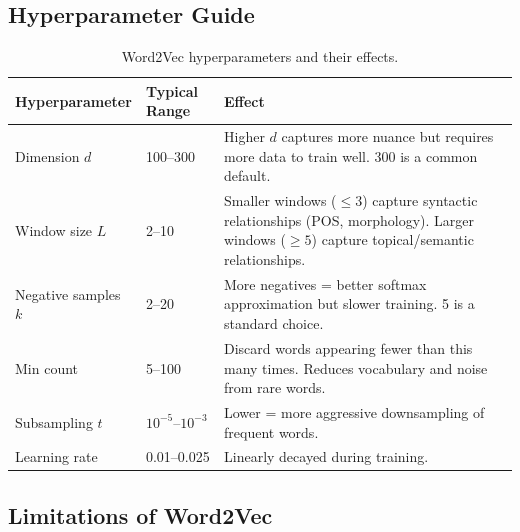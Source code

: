 \subsection{Hyperparameter Guide}

\begin{table}[H]
\centering
\caption{Word2Vec hyperparameters and their effects.}
\label{tab:w2v_hyperparams}
\begin{tabularx}{\textwidth}{l l X}
\toprule
\textbf{Hyperparameter} & \textbf{Typical Range} & \textbf{Effect} \\
\midrule
Dimension $d$ & 100--300 & Higher $d$ captures more nuance but
    requires more data to train well. 300 is a common default. \\
Window size $L$ & 2--10 & Smaller windows ($\leq 3$) capture syntactic
    relationships (POS, morphology). Larger windows ($\geq 5$) capture
    topical/semantic relationships. \\
Negative samples $k$ & 2--20 & More negatives = better softmax
    approximation but slower training. 5 is a standard choice. \\
Min count & 5--100 & Discard words appearing fewer than this many times.
    Reduces vocabulary and noise from rare words. \\
Subsampling $t$ & $10^{-5}$--$10^{-3}$ & Lower = more aggressive
    downsampling of frequent words. \\
Learning rate & 0.01--0.025 & Linearly decayed during training. \\
\bottomrule
\end{tabularx}
\end{table}

\subsection{Limitations of Word2Vec}

